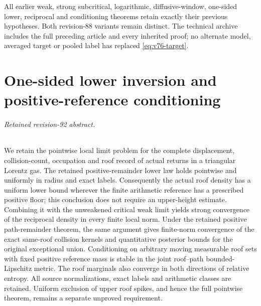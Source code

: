 \documentclass[11pt,reqno]{amsart}
\numberwithin{equation}{section}
\theoremstyle{definition}\newtheorem{definition}[theorem]{Definition}
\theoremstyle{remark}\newtheorem{remark}[theorem]{Remark}
\theoremstyle{definition}\newtheorem{inputstatement}[theorem]{Input statement}
\begin{document}
All earlier weak, strong subcritical, logarithmic, diffusive-window,
one-sided lower, reciprocal and conditioning theorems retain exactly
their previous hypotheses. Both revision-88 variants remain distinct.
The technical archive includes the full preceding article and every
inherited proof; no alternate model, averaged target or pooled label
has replaced \eqref{eq:v76-target}.

\appendix


\endgroup
\part{One-sided lower inversion and positive-reference conditioning}
\begingroup
\let\ArchiveLabel\label
\let\ArchiveRef\ref
\renewcommand{\label}[1]{\ArchiveLabel{v92archive:#1}}
\renewcommand{\ref}[1]{%
  \IfBeginWith{#1}{supp-}{%
    \StrBehind{#1}{supp-}[\ArchiveTarget]%
    \ArchiveRef{\ArchiveTarget}%
  }{\ArchiveRef{v92archive:#1}}%
}
\makeatletter
\let\ltx@label\label
\makeatother
\paragraph{Retained revision-92 abstract.}

We retain the pointwise local limit problem for the complete displacement,
collision-count, occupation and roof record of actual returns in a
triangular Lorentz gas. The retained positive-remainder lower law holds
pointwise and uniformly in radius and exact labels.
Consequently the actual roof density has a uniform lower bound wherever
the finite arithmetic reference has a prescribed positive floor; this
conclusion does not require an upper-height estimate. Combining it with
the unweakened critical weak limit yields strong convergence of the
reciprocal density in every finite local norm. Under the retained positive
path-remainder theorem, the same argument gives finite-norm convergence
of the exact same-roof collision kernels and quantitative posterior
bounds for the original exceptional union. Conditioning on arbitrary
moving measurable roof sets with fixed positive reference mass is stable
in the joint roof--path bounded-Lipschitz metric. The roof marginals also
converge in both directions of relative entropy. All source normalizations,
exact labels and arithmetic classes are retained. Uniform exclusion of
upper roof spikes, and hence the full pointwise theorem, remains a separate
unproved requirement.
\end{document}
